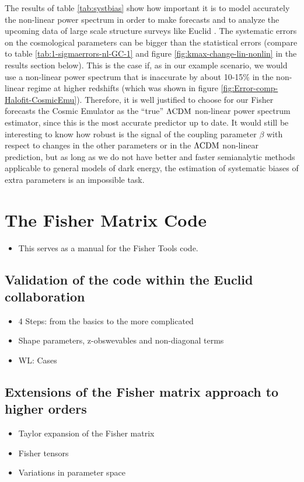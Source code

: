 The results of table \ref{tab:systbias} show how important it is
to model accurately the non-linear power spectrum in order to make
forecasts and to analyze the upcoming data of large scale structure
surveys like Euclid \cite{amendola_cosmology_2012-short}. The systematic
errors on the cosmological parameters can be bigger than the statistical
errors (compare to table \ref{tab:1-sigmaerrors-nl-GC-1} and figure
\ref{fig:kmax-change-lin-nonlin} in the results section below). This
is the case if, as in our example scenario, we would use a non-linear
power spectrum that is inaccurate by about 10-15\% in the non-linear
regime at higher redshifts (which was shown in figure \ref{fig:Error-comp-Halofit-CosmicEmu}).
Therefore, it is well justified to choose for our Fisher forecasts
the Cosmic Emulator as the ``true'' $\Lambda\mathrm{CDM}$ non-linear power spectrum
estimator, since this is the most accurate predictor up to date. It
would still be interesting to know how robust is the signal of the
coupling parameter $\beta$ with respect to changes in the other parameters
or in the $\Lambda\mathrm{CDM}$ non-linear prediction, but as long as we do not
have better and faster semianalytic methods applicable to general
models of dark energy, the estimation of systematic biases of extra
parameters is an impossible task.

\section{The Fisher Matrix Code }
\begin{itemize}
\item This serves as a manual for the Fisher Tools code.
\end{itemize}

\subsection{Validation of the code within the Euclid collaboration}
\begin{itemize}
\item 4 Steps: from the basics to the more complicated
\item Shape parameters, z-obswevables and non-diagonal terms
\item WL: Cases
\end{itemize}

\subsection{Extensions of the Fisher matrix approach to higher orders}
\begin{itemize}
\item Taylor expansion of the Fisher matrix
\item Fisher tensors
\item Variations in parameter space
\end{itemize}






